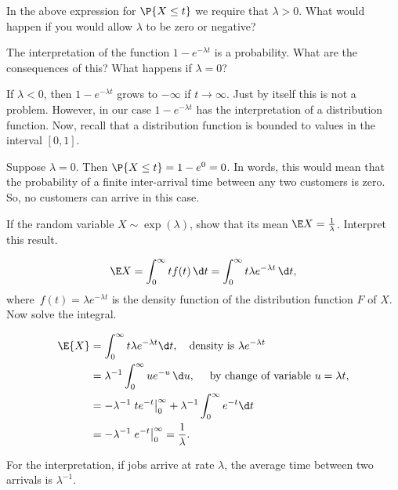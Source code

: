 \begin{exercise} 
In the above expression for $\P{X\leq t}$ we require that $\lambda>0$. What would happen if you would allow $\lambda$ to be zero or negative?
\begin{hint}
  The interpretation of the function $1-e^{-\lambda t}$ is a probability. What are the consequences of this? What happens if $\lambda=0$?
\end{hint}
\begin{solution}
  If $\lambda<0$, then $1-e^{-\lambda t}$ grows to $-\infty$ if $t\to \infty$. Just by itself this is not a problem. However, in our case $1-e^{-\lambda t}$ has the interpretation of a distribution function. Now, recall that a distribution function is bounded to values in the interval $[0,1]$.

Suppose $\lambda=0$. Then $\P{X\leq t} = 1-e^{0} = 0$. In words, this would mean that the probability of a finite inter-arrival time between any two customers is zero. So, no customers can arrive in this case. 
\end{solution}
\end{exercise}

\begin{exercise} \label{exer:lambda}
  If the random variable $X\sim\exp(\lambda)$, show that its mean $\E X = \frac{1}\lambda$. Interpret this result.
  \begin{hint}
 \begin{equation*}
    \E X = \int_0^\infty t f(t)\, \d t =
    \int_0^\infty t \lambda e^{-\lambda t}\, \d t,
  \end{equation*}
  where~$f(t)=\lambda e^{-\lambda t}$ is the density function of the distribution function $F$ of $X$. Now solve the integral.
  \end{hint}
  \begin{solution}
    \begin{align*}
\E{X} 
&= \int_0^\infty t \lambda e^{-\lambda t} \d t, \quad\text{density is } \lambda e^{-\lambda t} \\
&=   \lambda^{-1} \int_0^\infty u e^{-u}\, \d u, \quad \text{ by  change of variable $u=\lambda t$},   \\
&=  -\lambda^{-1}\left. t e^{- t}\right|_0^\infty + \lambda^{-1} \int_0^\infty e^{- t} \d t\\
&=  - \lambda^{-1} \left. e^{- t} \right|_0^\infty =  \frac1\lambda.
    \end{align*}

For the interpretation, if jobs arrive at rate $\lambda$, the average time between two arrivals is $\lambda^{-1}$.
  \end{solution}
\end{exercise}


